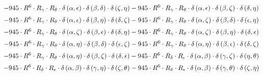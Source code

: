 \begin{subequations}
\begin{gather}
 \\[0.2em] \notag 		 - 945 \cdot R^{6} \cdot R_{\gamma{}} \cdot R_{\theta{}} \cdot \delta{}\left(\alpha{}, \epsilon{}\right) \cdot \delta{}\left(\beta{}, \delta{}\right) \cdot \delta{}\left(\zeta{}, \eta{}\right)- 945 \cdot R^{6} \cdot R_{\gamma{}} \cdot R_{\theta{}} \cdot \delta{}\left(\alpha{}, \epsilon{}\right) \cdot \delta{}\left(\beta{}, \zeta{}\right) \cdot \delta{}\left(\delta{}, \eta{}\right) 
 \\[0.2em] \notag 		 - 945 \cdot R^{6} \cdot R_{\gamma{}} \cdot R_{\theta{}} \cdot \delta{}\left(\alpha{}, \epsilon{}\right) \cdot \delta{}\left(\beta{}, \eta{}\right) \cdot \delta{}\left(\delta{}, \zeta{}\right)- 945 \cdot R^{6} \cdot R_{\gamma{}} \cdot R_{\theta{}} \cdot \delta{}\left(\alpha{}, \zeta{}\right) \cdot \delta{}\left(\beta{}, \delta{}\right) \cdot \delta{}\left(\epsilon{}, \eta{}\right) 
 \\[0.2em] \notag 		 - 945 \cdot R^{6} \cdot R_{\gamma{}} \cdot R_{\theta{}} \cdot \delta{}\left(\alpha{}, \zeta{}\right) \cdot \delta{}\left(\beta{}, \epsilon{}\right) \cdot \delta{}\left(\delta{}, \eta{}\right)- 945 \cdot R^{6} \cdot R_{\gamma{}} \cdot R_{\theta{}} \cdot \delta{}\left(\alpha{}, \zeta{}\right) \cdot \delta{}\left(\beta{}, \eta{}\right) \cdot \delta{}\left(\delta{}, \epsilon{}\right) 
 \\[0.2em] \notag 		 - 945 \cdot R^{6} \cdot R_{\gamma{}} \cdot R_{\theta{}} \cdot \delta{}\left(\alpha{}, \eta{}\right) \cdot \delta{}\left(\beta{}, \delta{}\right) \cdot \delta{}\left(\epsilon{}, \zeta{}\right)- 945 \cdot R^{6} \cdot R_{\gamma{}} \cdot R_{\theta{}} \cdot \delta{}\left(\alpha{}, \eta{}\right) \cdot \delta{}\left(\beta{}, \epsilon{}\right) \cdot \delta{}\left(\delta{}, \zeta{}\right) 
 \\[0.2em] \notag 		 - 945 \cdot R^{6} \cdot R_{\gamma{}} \cdot R_{\theta{}} \cdot \delta{}\left(\alpha{}, \eta{}\right) \cdot \delta{}\left(\beta{}, \zeta{}\right) \cdot \delta{}\left(\delta{}, \epsilon{}\right)- 945 \cdot R^{6} \cdot R_{\delta{}} \cdot R_{\epsilon{}} \cdot \delta{}\left(\alpha{}, \beta{}\right) \cdot \delta{}\left(\gamma{}, \zeta{}\right) \cdot \delta{}\left(\eta{}, \theta{}\right) 
 \\[0.2em] \notag 		 - 945 \cdot R^{6} \cdot R_{\delta{}} \cdot R_{\epsilon{}} \cdot \delta{}\left(\alpha{}, \beta{}\right) \cdot \delta{}\left(\gamma{}, \eta{}\right) \cdot \delta{}\left(\zeta{}, \theta{}\right)- 945 \cdot R^{6} \cdot R_{\delta{}} \cdot R_{\epsilon{}} \cdot \delta{}\left(\alpha{}, \beta{}\right) \cdot \delta{}\left(\gamma{}, \theta{}\right) \cdot \delta{}\left(\zeta{}, \eta{}\right) 

\end{gather}
\end{subequations}
